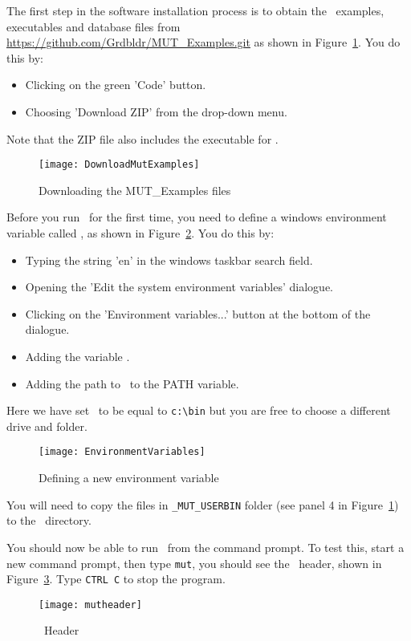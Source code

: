 \label{texfile:Installation}
The first step in the software installation process is to obtain the \mut\ examples, executables and database files from
\url{https://github.com/Grdbldr/MUT_Examples.git} as shown in Figure~\ref{fig:mutexamples}.  You do this by:
\begin{itemize}
     \item Clicking on the green 'Code' button.
     \item Choosing 'Download ZIP' from the drop-down menu.
\end{itemize}
Note that the ZIP file also includes the executable for \mfus.
\begin{figure}
    \texttt{[image: DownloadMutExamples]}
    \caption{Downloading the MUT\_Examples files}
    \label{fig:mutexamples}
\end{figure}

Before you run \mut\ for the first time, you need to define a windows environment variable called \bin, as shown in Figure~\ref{fig:envvar}.  You do this by:
\begin{itemize}
     \item Typing the string 'en' in the windows taskbar search field.
     \item Opening the 'Edit the system environment variables' dialogue.
     \item Clicking on the 'Environment variables...' button at the bottom of the dialogue.
     \item Adding the variable \bin.
     \item Adding the path to \bin\ to the PATH variable.
\end{itemize}
Here we have set \bin\ to be equal to \verb+c:\bin+ but you are free to choose a different drive and folder.
\begin{figure}
    \texttt{[image: EnvironmentVariables]}
    \caption{Defining a new environment variable}
    \label{fig:envvar}
\end{figure}
You will need to copy the files in \verb+_MUT_USERBIN+ folder (see panel 4 in Figure~\ref{fig:mutexamples}) to the \bin\ directory.

You should now be able to run \mut\ from the command prompt.  To test this, start a new command prompt, then type \texttt{mut}, you should see the \mut\ header, shown in Figure~\ref{fig:mutheader}.  Type \texttt{CTRL C} to stop the program.
\begin{figure}
    \texttt{[image: mutheader]}
    \caption{\mut\ Header}
    \label{fig:mutheader}
\end{figure}

